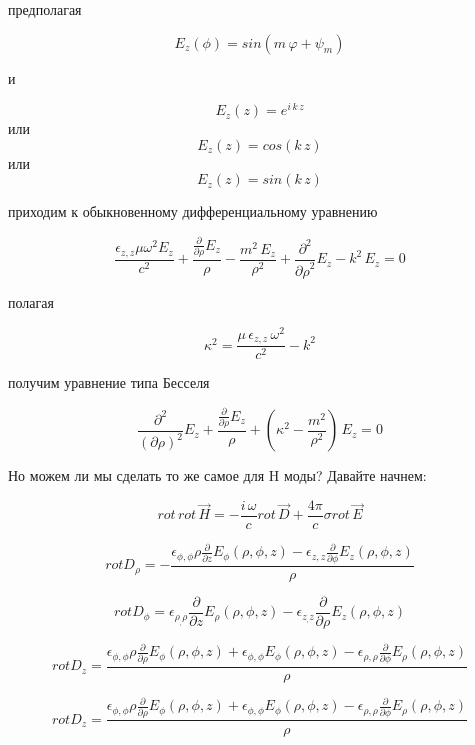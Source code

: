 \documentclass{article}
\begin{document}
предполагая

$$E_{z}(\phi) = sin(m\,\varphi + \psi_{m})$$

и

$$E_{z}(z) = e^{i\,k\,z}$$
или
$$E_{z}(z) = cos\left(k\,z\right)$$
или
$$E_{z}(z) = sin\left(k\,z\right)$$

приходим к обыкновенному дифференциальному уравнению

$$\frac{\epsilon_{z,z} \mu \omega^{2} E_{z}}{c^{2}} + \frac{\frac{\partial}{\partial {\rho}}E_{z}}{{\rho}} - \frac{m^{2}\,E_{z}}{{\rho}^{2}} + \frac{\partial^{2}}{{\partial {\rho}}^{2}}E_{z} - k^2\,E_{z} = 0$$

полагая

$$\kappa^2 = \frac{\mu \, {\epsilon}_{z,z} \, \omega^2}{c^2} - k^2$$

получим уравнение типа Бесселя

$$\frac{\partial^{2}}{(\partial {\rho})^{2}}E_{z} + \frac{\frac{\partial}{\partial {\rho}}E_{z}}{{\rho}} + \left(\kappa^2 - \frac{m^{2}}{{\rho}^{2}}\right)\,E_{z} = 0$$


Но можем ли мы сделать то же самое для H моды?
Давайте начнем:



$$rot\,rot\,\vec{H} = - \frac{i\,\omega}{c} rot\, \vec{D}  + \frac{4\pi}{c} \sigma rot\,\vec{E}$$


$$rot D_{\rho}=-\frac{{\epsilon}_{\phi,\phi} {\rho} \frac{\partial}{\partial \mathit{z}}E_{\phi}\left({\rho}, {\phi}, \mathit{z}\right) - {\epsilon}_{z,z} \frac{\partial}{\partial {\phi}}E_{z}\left({\rho}, {\phi}, \mathit{z}\right)}{{\rho}}$$

$$rot D_{\phi}={\epsilon}_{\rho_,\rho} \frac{\partial}{\partial \mathit{z}}E_{\rho}\left({\rho}, {\phi}, \mathit{z}\right) - \epsilon_{z_,z} \frac{\partial}{\partial {\rho}}E_{z}\left({\rho}, {\phi}, \mathit{z}\right)$$

$$rot D_{z}=\frac{{\epsilon}_{\phi,\phi} {\rho} \frac{\partial}{\partial {\rho}}E_{\phi}\left({\rho}, {\phi}, \mathit{z}\right) + \epsilon_{\phi,\phi} E_{\phi}\left({\rho}, {\phi}, \mathit{z}\right) - {\epsilon}_{\rho,\rho} \frac{\partial}{\partial {\phi}}E_{\rho}\left({\rho}, {\phi}, \mathit{z}\right)}{{\rho}}$$

$$rot D_{z}=\frac{{\epsilon}_{\phi,\phi} {\rho} \frac{\partial}{\partial {\rho}}E_{\phi}\left({\rho}, {\phi}, \mathit{z}\right) + {\epsilon}_{\phi,\phi} E_{\phi}\left({\rho}, {\phi}, \mathit{z}\right) - {\epsilon}_{\rho,\rho} \frac{\partial}{\partial {\phi}}E_{\rho}\left({\rho}, {\phi}, \mathit{z}\right)}{{\rho}}$$
\end{document}
